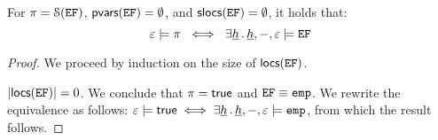 \begin{lemma}\label{sanity}
For $\pi = {\cal S}(\mathtt{EF})$, ${\sf pvars}(\mathtt{EF}) = \emptyset$, and ${\sf slocs}(\mathtt{EF}) = \emptyset$, 
it holds that: 
$$
  \senv \satisfies \pc  \ \iff \ 
       \exists \iheap \, . \, \iheap, -, \senv \satisfies \efs
$$
\end{lemma}
\begin{proof}
We proceed by induction on the size of ${\sf locs}(\mathtt{EF})$. 
\vspace{6pt}

\noindent{}  $\vert {\sf locs}(\mathtt{EF}) \vert = 0$. We conclude that $\pi = {\sf true}$ 
and $\mathtt{EF} \equiv \texttt{emp}$. We rewrite the equivalence as follows: 
$
 \varepsilon \models {\sf true}  \iff  \exists \underline{h} \, . \, \underline{h}, -, \varepsilon \models \texttt{emp}
$,
from which the result follows. 
\vspace{6pt}


\end{proof}
